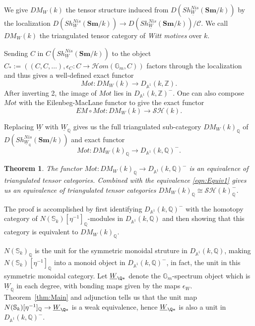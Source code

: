 \documentclass[a4paper,12pt,draft]{amsart}
\newtheorem{theorem}{Theorem}
\theoremstyle{definition}
\theoremstyle{remark}
\begin{document}
We give  $DM_W(k)$ the tensor structure induced from $D(Sh^{Nis}_{\underline{W}}({{\mathbf{Sm}}}/k))$ by the localization $D(Sh^{Nis}_{\underline{W}}({{\mathbf{Sm}}}/k))\to D(Sh^{Nis}_{\underline{W}}({{\mathbf{Sm}}}/k))/{{\mathcal C}}$. We call $DM_W(k)$ the triangulated tensor category of {\em Witt motives} over $k$. 
 
Sending $C$ in $C(Sh^{Nis}_{\underline{W}}({{\mathbf{Sm}}}/k))$ to the object $C_*:=((C, C, \ldots), \epsilon_C:C\to {{\mathcal{H}{om}}}({{\mathbb G}}_m, C))$ factors through the localization and thus gives a well-defined exact functor 
\[
Mot:DM_W(k)\to D_{{{\mathbb A}}^1}(k,{{\mathbb Z}}).
\]
After inverting 2, the image of $Mot$ lies in $D_{{{\mathbb A}}^1}(k,{{\mathbb Z}})^-$. One can also compose $Mot$ with the Eilenbeg-MacLane functor to give the exact functor
\[
EM\circ Mot:DM_W(k)\to {\mathcal{SH}}(k).
\]

Replacing $\underline{W}$ with $\underline{W}_{{\mathbb Q}}$  gives us the full triangulated sub-category $DM_W(k)_{{\mathbb Q}}$ of $D(Sh^{Nis}_{\underline{W}_{{\mathbb Q}}}({{\mathbf{Sm}}}/k))$ and exact functor
\[
Mot:DM_W(k)_{{\mathbb Q}}\to D_{{{\mathbb A}}^1}(k,{{\mathbb Q}})^-.
\]

\begin{theorem} \label{thm:Equiv} The functor $Mot:DM_W(k)_{{\mathbb Q}}\to D_{{{\mathbb A}}^1}(k,{{\mathbb Q}})^-$ is an equivalence of triangulated tensor categories. Combined with the equivalence \eqref{eqn:Equiv1} gives us an   equivalence of triangulated tensor categories
$DM_W(k)_{{\mathbb Q}}\cong {\mathcal{SH}}(k)^-_{{\mathbb Q}}$.
\end{theorem}

The proof is accomplished by first identifying $D_{{{\mathbb A}}^1}(k,{{\mathbb Q}})^-$ with the homotopy category of $N({{\mathbb S}}_k)[\eta^{-1}]_{{\mathbb Q}}$-modules in $D_{{{\mathbb A}}^1}(k,{{\mathbb Q}})$ and then showing that this category is equivalent to $DM_W(k)_{{\mathbb Q}}$.

$N({{\mathbb S}}_k)_{{\mathbb Q}}$ is the unit for the symmetric monoidal struture in $D_{{{\mathbb A}}^1}(k,{{\mathbb Q}})$, making $N({{\mathbb S}}_k)[\eta^{-1}]_{{\mathbb Q}}$ into a monoid object  in $D_{{{\mathbb A}}^1}(k,{{\mathbb Q}})^-$, in fact, the unit in this symmetric monoidal category. Let $\underline{W}_{\Q*}$ denote the ${{\mathbb G}}_m$-spectrum object which is $\underline{W}_{{\mathbb Q}}$ in each degree, with bonding maps given by the maps $\epsilon_W$.  Theorem~\ref{thm:Main} and adjunction tells us that the unit map $N({{\mathbb S}}_k)[\eta^{-1}]_{{\mathbb Q}}\to \underline{W}_{\Q*}$ is a weak equivalence, hence $\underline{W}_{\Q*}$ is also a unit in $D_{{{\mathbb A}}^1}(k,{{\mathbb Q}})^-$.
\end{document}
